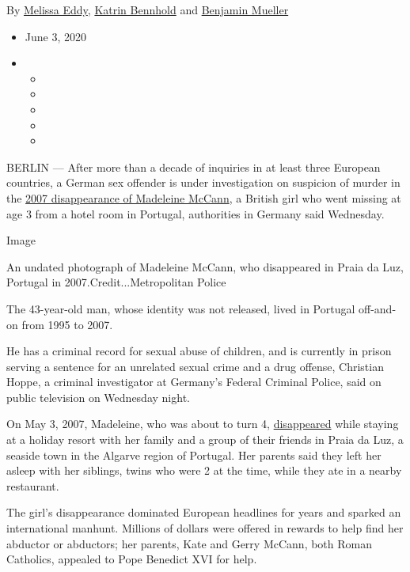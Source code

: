 By \href{https://www.nytimes.com/by/melissa-eddy}{Melissa Eddy},
\href{https://www.nytimes.com/by/katrin-bennhold}{Katrin Bennhold} and
\href{https://www.nytimes.com/by/benjamin-mueller}{Benjamin Mueller}

\begin{itemize}
\item
  June 3, 2020
\item
  \begin{itemize}
  \item
  \item
  \item
  \item
  \item
  \end{itemize}
\end{itemize}

BERLIN --- After more than a decade of inquiries in at least three
European countries, a German sex offender is under investigation on
suspicion of murder in the
\href{https://www.nytimes.com/2020/06/04/world/europe/german-suspect-madeleine-mccann.html}{2007
disappearance of Madeleine McCann}, a British girl who went missing at
age 3 from a hotel room in Portugal, authorities in Germany said
Wednesday.

Image

An undated photograph of Madeleine McCann, who disappeared in Praia da
Luz, Portugal in 2007.Credit...Metropolitan Police

The 43-year-old man, whose identity was not released, lived in Portugal
off-and-on from 1995 to 2007.

He has a criminal record for sexual abuse of children, and is currently
in prison serving a sentence for an unrelated sexual crime and a drug
offense, Christian Hoppe, a criminal investigator at Germany's Federal
Criminal Police, said on public television on Wednesday night.

On May 3, 2007, Madeleine, who was about to turn 4,
\href{https://www.nytimes.com/2007/09/08/world/europe/08iht-08portugal.7428538.html?searchResultPosition=24}{disappeared}
while staying at a holiday resort with her family and a group of their
friends in Praia da Luz, a seaside town in the Algarve region of
Portugal. Her parents said they left her asleep with her siblings, twins
who were 2 at the time, while they ate in a nearby restaurant.

The girl's disappearance dominated European headlines for years and
sparked an international manhunt. Millions of dollars were offered in
rewards to help find her abductor or abductors; her parents, Kate and
Gerry McCann, both Roman Catholics, appealed to Pope Benedict XVI for
help.

